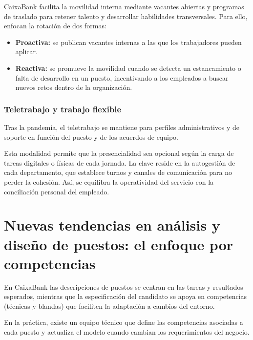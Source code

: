 CaixaBank facilita la movilidad interna mediante vacantes abiertas y programas de traslado para retener talento y desarrollar habilidades transversales.
Para ello, enfocan la rotación de dos formas:
\begin{itemize}
  \item \textbf{Proactiva:} se publican vacantes internas a las que los trabajadores pueden aplicar.
  \item \textbf{Reactiva:} se promueve la movilidad cuando se detecta un estancamiento o falta de desarrollo en un puesto, incentivando a los empleados a buscar nuevos retos dentro de la organización.
\end{itemize}

\subsubsection{Teletrabajo y trabajo flexible}

Tras la pandemia, el teletrabajo se mantiene para perfiles administrativos y de soporte en función del puesto y de los acuerdos de equipo.

Esta modalidad permite que la presencialidad sea opcional según la carga de tareas digitales o físicas de cada jornada. La clave reside en la autogestión de cada departamento, que establece turnos y canales de comunicación para no perder la cohesión. Así, se equilibra la operatividad del servicio con la conciliación personal del empleado.


\section{Nuevas tendencias en análisis y diseño de puestos: el enfoque por competencias}

En CaixaBank las descripciones de puestos se centran en las tareas y resultados esperados, mientras que la especificación del candidato se apoya en competencias (técnicas y blandas) que faciliten la adaptación a cambios del entorno.

En la práctica, existe un equipo técnico que define las competencias asociadas a cada puesto y actualiza el modelo cuando cambian los requerimientos del negocio.
